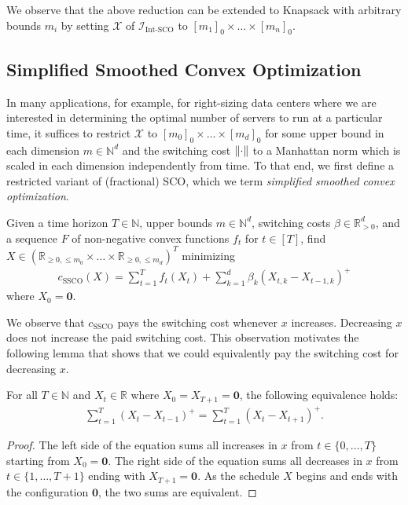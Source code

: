 We observe that the above reduction can be extended to Knapsack with arbitrary bounds $m_i$ by setting $\mathcal{X}$ of $\mathcal{I}_{\text{Int-SCO}}$ to $[m_1]_0 \times \dots \times [m_n]_0$.

\subsection{Simplified Smoothed Convex Optimization}\label{section:theory:simplified_smoothed_convex_optimization}

In many applications, for example, for right-sizing data centers where we are interested in determining the optimal number of servers to run at a particular time, it suffices to restrict $\mathcal{X}$ to $[m_0]_0 \times \dots \times [m_d]_0$ for some upper bound in each dimension $m \in \mathbb{N}^d$ and the switching cost $\lVert\cdot\rVert$ to a Manhattan norm which is scaled in each dimension independently from time. To that end, we first define a restricted variant of (fractional) SCO, which we term \emph{simplified smoothed convex optimization}.

\begin{problem}\label{problem:simplified_smoothed_convex_optimization}
Given a time horizon $T \in \mathbb{N}$, upper bounds $m \in \mathbb{N}^d$, switching costs $\beta \in \mathbb{R}_{>0}^d$, and a sequence $F$ of non-negative convex functions $f_t$ for $t \in [T]$, find $X \in (\mathbb{R}_{\geq 0, \leq m_0} \times \dots \times \mathbb{R}_{\geq 0, \leq m_d})^T$ minimizing \begin{align}\label{eq:simplified_smoothed_convex_optimization}
    c_{\text{SSCO}}(X) = \sum_{t=1}^T f_t(X_t) + \sum_{k=1}^d \beta_k (X_{t,k} - X_{t-1,k})^+
\end{align}
where $X_0 = \mathbf{0}$.
\end{problem}

We observe that $c_{\text{SSCO}}$ pays the switching cost whenever $x$ increases. Decreasing $x$ does not increase the paid switching cost. This observation motivates the following lemma that shows that we could equivalently pay the switching cost for decreasing $x$.

\begin{lemma}
\label{lemma:inverse_switching_cost}
For all $T \in \mathbb{N}$ and $ X_t \in \mathbb{R}$ where $X_0 = X_{T+1} = \mathbf{0}$, the following equivalence holds:
\begin{align*}
    \sum_{t=1}^T (X_t - X_{t-1})^+ = \sum_{t=1}^T (X_t - X_{t+1})^+.
\end{align*}
\end{lemma}
\begin{proof}
The left side of the equation sums all increases in $x$ from $t \in \{0, \dots, T\}$ starting from $X_0 = \mathbf{0}$. The right side of the equation sums all decreases in $x$ from $t \in \{1, \dots, T+1\}$ ending with $X_{T+1} = \mathbf{0}$. As the schedule $X$ begins and ends with the configuration $\mathbf{0}$, the two sums are equivalent.
\end{proof}

